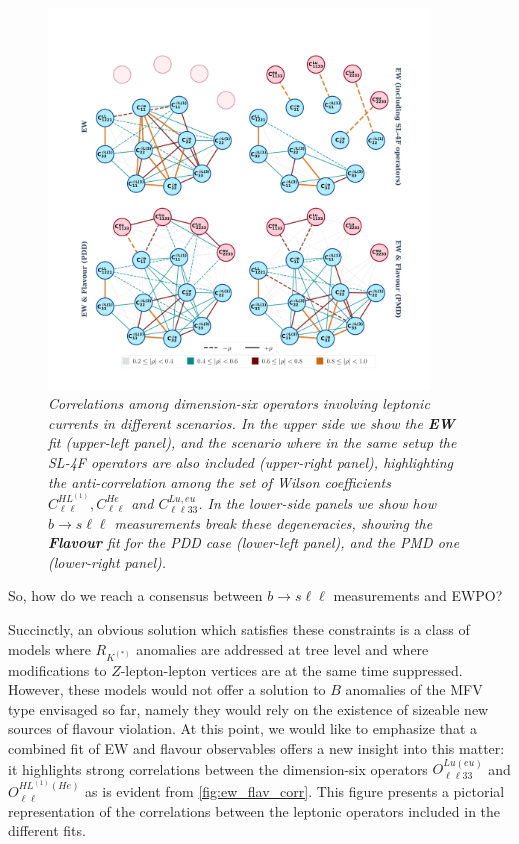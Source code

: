 \begin{figure}[t]
	\centering
	\includegraphics[width=0.9\textwidth]{figures/fixed_EW_flavour.pdf}
	\caption{\it Correlations among dimension-six operators involving leptonic currents in different scenarios. In the upper side we show the \textbf{EW} fit (upper-left panel), and the scenario where in the same setup the SL-4F operators are also included (upper-right panel), highlighting the anti-correlation among the set of Wilson coefficients  $C^{HL^{(1)}}_{\ell\ell}, C^{He}_{\ell\ell}$ and $C^{Lu,eu}_{\ell\ell33}$.
		In the lower-side panels we show how $b \to s \ell \ell$ measurements break these degeneracies, showing the \textbf{Flavour} fit for the PDD case (lower-left panel), and the PMD one (lower-right panel). 
	}
	\label{fig:ew_flav_corr}
\end{figure}

So, how do we reach a consensus between $b \to s \ell \ell$ measurements and EWPO?

\noindent Succinctly, an obvious solution which satisfies these constraints is a class of models where $R_{K^{(*)}}$ anomalies are addressed at tree level and where modifications to $Z$-lepton-lepton vertices are at the same time suppressed. However, these models would not offer a solution to $B$ anomalies of the MFV type envisaged so far, namely they would rely on the existence of sizeable new sources of flavour violation. At this point, we would like to emphasize that a combined fit of EW and flavour observables offers a new insight into this matter: it highlights strong correlations between the dimension-six operators $O^{Lu(eu)}_{\ell\ell33}$ and $O^{HL^{(1)}(He)}_{\ell\ell}$ as is evident from \autoref{fig:ew_flav_corr}. This figure presents a pictorial representation of the correlations between the leptonic operators included in the different fits. 

